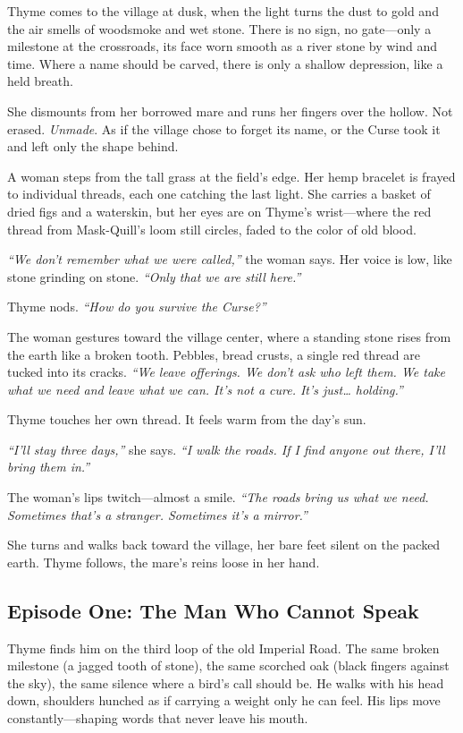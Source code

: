 \documentclass[11pt]{book}
\begin{document}
Thyme comes to the village at dusk, when the light turns the dust to gold and the air smells of woodsmoke and wet stone. There is no sign, no gate---only a milestone at the crossroads, its face worn smooth as a river stone by wind and time. Where a name should be carved, there is only a shallow depression, like a held breath.

She dismounts from her borrowed mare and runs her fingers over the hollow. Not erased. \textit{Unmade}. As if the village chose to forget its name, or the Curse took it and left only the shape behind.

A woman steps from the tall grass at the field's edge. Her hemp bracelet is frayed to individual threads, each one catching the last light. She carries a basket of dried figs and a waterskin, but her eyes are on Thyme's wrist---where the red thread from Mask-Quill's loom still circles, faded to the color of old blood.

\textit{``We don't remember what we were called,'' } the woman says. Her voice is low, like stone grinding on stone. \textit{``Only that we are still here.''}

Thyme nods. \textit{``How do you survive the Curse?''}

The woman gestures toward the village center, where a standing stone rises from the earth like a broken tooth. Pebbles, bread crusts, a single red thread are tucked into its cracks. \textit{``We leave offerings. We don't ask who left them. We take what we need and leave what we can. It's not a cure. It's just\ldots{} holding.''}

Thyme touches her own thread. It feels warm from the day's sun.

\textit{``I'll stay three days,'' } she says. \textit{``I walk the roads. If I find anyone out there, I'll bring them in.''}

The woman's lips twitch---almost a smile. \textit{``The roads bring us what we need. Sometimes that's a stranger. Sometimes it's a mirror.''}

She turns and walks back toward the village, her bare feet silent on the packed earth. Thyme follows, the mare's reins loose in her hand.

\subsection*{Episode One: The Man Who Cannot Speak}
Thyme finds him on the third loop of the old Imperial Road. The same broken milestone (a jagged tooth of stone), the same scorched oak (black fingers against the sky), the same silence where a bird's call should be. He walks with his head down, shoulders hunched as if carrying a weight only he can feel. His lips move constantly---shaping words that never leave his mouth.
\end{document}
